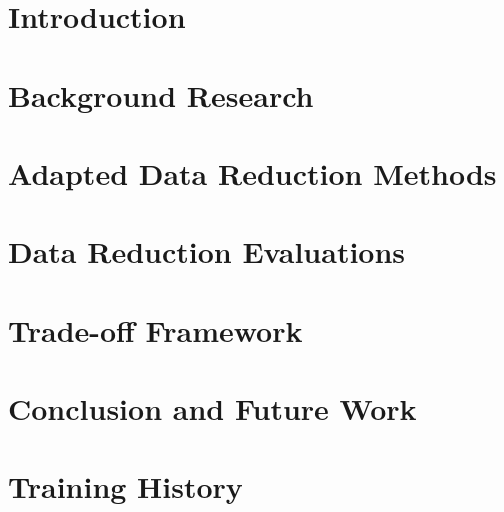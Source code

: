 \documentclass[msc,deptreport,dsti]{infthesis} %
\begin{document}
\chapter{Introduction}


\chapter{Background Research}
\label{bg}


\chapter{Adapted Data Reduction Methods}


\chapter{Data Reduction Evaluations}


\chapter{Trade-off Framework}


\chapter{Conclusion and Future Work}








 \appendix
 
 \chapter{Training History}
 

% 
\end{document}
